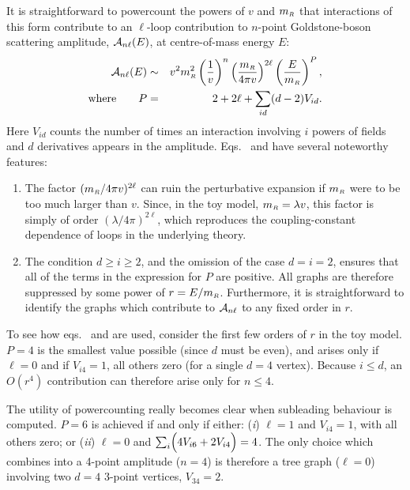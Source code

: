 It is straightforward to powercount \cite{Burgess95} the powers
of $v$ and $m_{\scriptscriptstyle R}$ that interactions of this form 
contribute to an $\ell$-loop contribution to
$n$-point Goldstone-boson scattering 
amplitude, ${\cal A}_{n\ell}(E)$, at centre-of-mass energy $E$:
%
\begin{eqnarray}
\label{PCresult1}
{\cal A}_{n\ell}(E) &\sim& v^2 m_{\scriptscriptstyle R}^2  \left( {1 \over v} 
\right)^n \left( { m_{\scriptscriptstyle R} \over 4 \pi v} \right)^{2\ell}
\left( {E \over m_{\scriptscriptstyle R}} \right)^P, \\
\hbox{where} \qquad P &=& 2 + 2\ell + \sum_{id} (d-2) V_{id}.
\label{PCresult2}
\end{eqnarray}
%
Here $V_{id}$ counts the number of times an interaction involving
$i$ powers of fields and $d$ derivatives appears
in the amplitude. Eqs.~ and 
have several noteworthy features:
%
\begin{enumerate}
\item
The factor $(m_{\scriptscriptstyle R}/4\pi v)^{2\ell}$ can ruin
the perturbative expansion if $m_{\scriptscriptstyle R}$ were to
be too much larger than $v$. Since, in the toy model,
$m_{\scriptscriptstyle R} = \lambda v$, this factor is simply
of order $(\lambda/4 \pi )^{2 \ell}$, which reproduces the
coupling-constant dependence of loops in the underlying theory.
%
\item
The condition $d \ge i \ge 2$, and the omission of
the case $d=i=2$, ensures that all of the
terms in the expression for $P$ are positive. All graphs
are therefore suppressed by some power of $r 
= E/m_{\scriptscriptstyle R}$. Furthermore, it is straightforward
to identify the graphs which contribute to ${\cal A}_{n\ell}$
to any fixed order in $r$. 
\end{enumerate}

To see how eqs.~ and 
are used, consider the first few orders of
$r$ in the toy model. $P=4$ is the smallest value possible (since $d$
must be even), and arises only if $\ell = 0$ and if $V_{i4}=1$, 
all others zero (for a single $d=4$ vertex).
Because $i \le d$, an $O(r^4)$ contribution can therefore
arise only for $n  \le 4$. 

The utility of powercounting really becomes clear when 
subleading behaviour is computed. $P=6$ is
achieved if and only if either: ({\it i}) $\ell = 1$ and $V_{i4} = 1$,
with all others zero; or ({\it ii}) $\ell = 0$ and $\sum_{i}
\Bigl(4 V_{i6} + 2 V_{i4} \Bigr) = 4$. The only choice
which combines into a 4-point amplitude ($n=4$) is
therefore a tree graph ($\ell = 0$) involving two $d=4$
3-point vertices, $V_{34} = 2$. 

